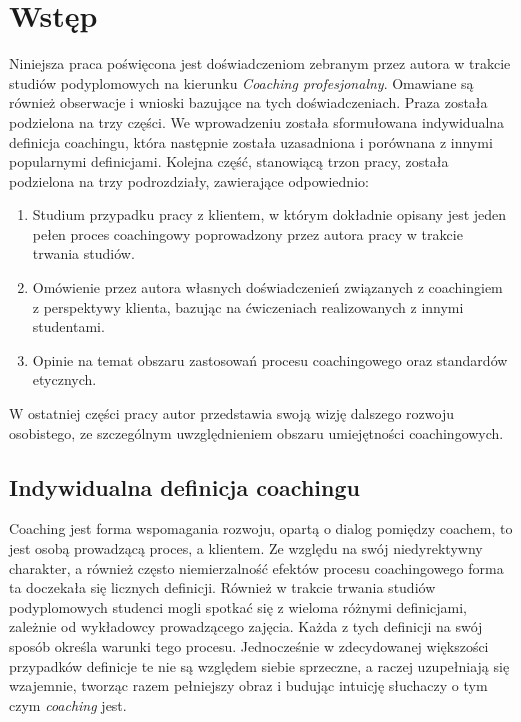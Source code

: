 \chapter{Wstęp}


Niniejsza praca poświęcona jest doświadczeniom zebranym przez autora w trakcie studiów podyplomowych na kierunku
\emph{Coaching profesjonalny}. Omawiane są również obserwacje i wnioski bazujące na tych doświadczeniach.
Praza została podzielona na trzy części. We wprowadzeniu została sformułowana indywidualna definicja coachingu,
która następnie została uzasadniona i porównana z innymi popularnymi definicjami. Kolejna część, stanowiącą trzon pracy,
została podzielona na trzy podrozdziały, zawierające odpowiednio:
\begin{enumerate}
  \item Studium przypadku pracy z klientem, w którym dokładnie opisany jest jeden pełen proces coachingowy poprowadzony
      przez autora pracy w trakcie trwania studiów.
  \item Omówienie przez autora własnych doświadczenień związanych z coachingiem z perspektywy klienta, bazując na
      ćwiczeniach realizowanych z innymi studentami.
  \item Opinie na temat obszaru zastosowań procesu coachingowego oraz standardów etycznych.
\end{enumerate}
W ostatniej części pracy autor przedstawia swoją wizję dalszego rozwoju osobistego, ze szczególnym uwzględnieniem
obszaru umiejętności coachingowych. \\

\section{Indywidualna definicja coachingu}
Coaching jest forma wspomagania rozwoju, opartą o dialog pomiędzy coachem, to jest osobą prowadzącą proces, a klientem.
Ze względu na swój niedyrektywny charakter, a również często niemierzalność efektów procesu coachingowego forma ta doczekała się
licznych definicji. Również w trakcie trwania studiów podyplomowych studenci mogli spotkać się z wieloma różnymi definicjami,
zależnie od wykładowcy prowadzącego zajęcia. Każda z tych definicji na swój sposób określa warunki tego procesu.
Jednocześnie w zdecydowanej większości przypadków definicje te nie są względem siebie sprzeczne, a raczej uzupełniają się
wzajemnie, tworząc razem pełniejszy obraz i budując intuicję słuchaczy o tym czym \emph{coaching} jest.

